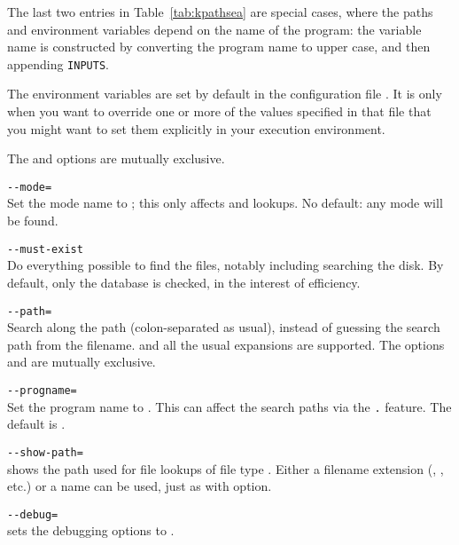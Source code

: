 \documentclass{article}
\begin{document}
\begin{multicols}{2}

  The last two entries in Table~\ref{tab:kpathsea} are special
  cases, where the paths and environment variables depend on the name
  of the program: the variable name is constructed by converting the
  program name to upper case, and then appending \texttt{INPUTS}.
  
  The environment variables are set by default in the configuration
  file . It is only when you want to override one or
  more of the values specified in that file that you might want to set
  them explicitly in your execution environment.

  The  and  options are mutually
  exclusive.

\begin{ttdescription}

\item[\texttt{-{}-mode=\var{string}}]\mbox{}\\
  Set the mode name to ; this only affects 
  and  lookups.  No default: any mode will be found.
\item[\texttt{-{}-must-exist}]\mbox{}\\
  Do everything possible to find the files, notably including
  searching the disk.  By default, only the  database is
  checked, in the interest of efficiency.
\item[\texttt{-{}-path=\var{string}}]\mbox{}\\
  Search along the path  (colon-separated as usual),
  instead of guessing the search path from the filename.  \samp{//} and
  all the usual expansions are supported.  The options 
  and  are mutually exclusive.
\item[\texttt{-{}-progname=\var{name}}]\mbox{}\\
  Set the program name to \texttt{}.
  This can affect the search paths via the \texttt{.}
  feature.
  The default is .
\item[\texttt{-{}-show-path=\var{name}}]\mbox{}\\
  shows the path used for file lookups of file type \texttt{}.
  Either a filename extension (, , etc.) or a
  name can be used, just as with  option.
\item[\texttt{-{}-debug=\var{num}}]\mbox{}\\
  sets the debugging options to \texttt{}.
\end{ttdescription}



\end{multicols}
\end{document}

